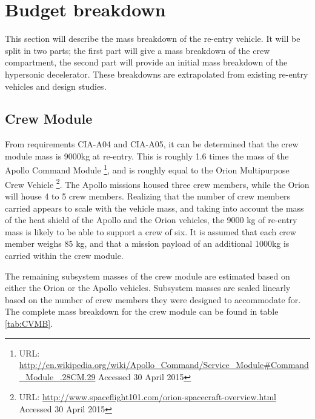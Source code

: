 \section{Budget breakdown} \label{ch:budget}
This section will describe the mass breakdown of the re-entry vehicle. It will be split in two parts; the first part will give a mass breakdown of the crew compartment, the second part will provide an initial mass breakdown of the hypersonic decelerator. These breakdowns are extrapolated from existing re-entry vehicles and design studies.


\subsection{Crew Module}
From requirements CIA-A04 and CIA-A05, it can be determined that the crew module mass is 9000kg at re-entry. This is roughly 1.6 times the mass of the Apollo Command Module \footnote{URL: \url{http://en.wikipedia.org/wiki/Apollo_Command/Service_Module#Command_Module_.28CM.29} Accessed 30 April 2015}, and is roughly equal to the Orion Multipurpose Crew Vehicle \footnote{URL: \url{http://www.spaceflight101.com/orion-spacecraft-overview.html} Accessed 30 April 2015}. The Apollo missions housed three crew members, while the Orion will house 4 to 5 crew members. Realizing that the number of crew members carried appears to scale with the vehicle mass, and taking into account the mass of the heat shield of the Apollo and the Orion vehicles, the 9000 kg of re-entry mass is likely to be able to support a crew of six. It is assumed that each crew member weighs 85 kg, and that a mission payload of an additional 1000kg is carried within the crew module. 

The remaining subsystem masses of the crew module are estimated based on either the Orion or the Apollo vehicles. Subsystem masses are scaled linearly based on the number of crew members they were designed to accommodate for. The complete mass breakdown for the crew module can be found in table \ref{tab:CVMB}.

